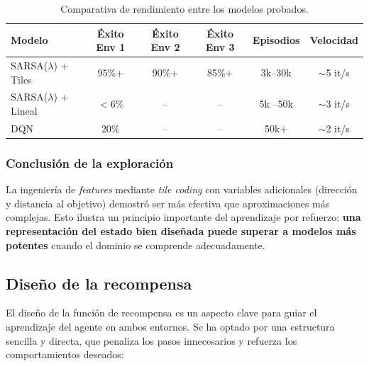 \documentclass[a4paper,12pt]{article}
\begin{document}
\begin{table}[H]
\centering
\begin{tabular}{|l|c|c|c|c|c|}
\hline
\textbf{Modelo} & \textbf{Éxito Env 1} & \textbf{Éxito Env 2} & \textbf{Éxito Env 3} & \textbf{Episodios} & \textbf{Velocidad} \\
\hline
SARSA($\lambda$) + Tiles & 95\%+ & 90\%+ & 85\%+ & 3k--30k & $\sim$5 it/s \\
SARSA($\lambda$) + Lineal & $<$6\% & -- & -- & 5k --50k & $\sim$3 it/s \\
DQN & 20\% & -- & -- & 50k+ & $\sim$2 it/s \\
\hline
\end{tabular}
\caption{Comparativa de rendimiento entre los modelos probados.}
\end{table}

\subsubsection{Conclusión de la exploración}

La ingeniería de \textit{features} mediante \textit{tile coding} con variables adicionales (dirección y distancia al objetivo) demostró ser más efectiva que aproximaciones más complejas. Esto ilustra un principio importante del aprendizaje por refuerzo: \textbf{una representación del estado bien diseñada puede superar a modelos más potentes} cuando el dominio se comprende adecuadamente.

\subsection{Diseño de la recompensa}

El diseño de la función de recompensa es un aspecto clave para guiar el aprendizaje del agente en ambos entornos. Se ha optado por una estructura sencilla y directa, que penaliza los pasos innecesarios y refuerza los comportamientos deseados:
\end{document}
